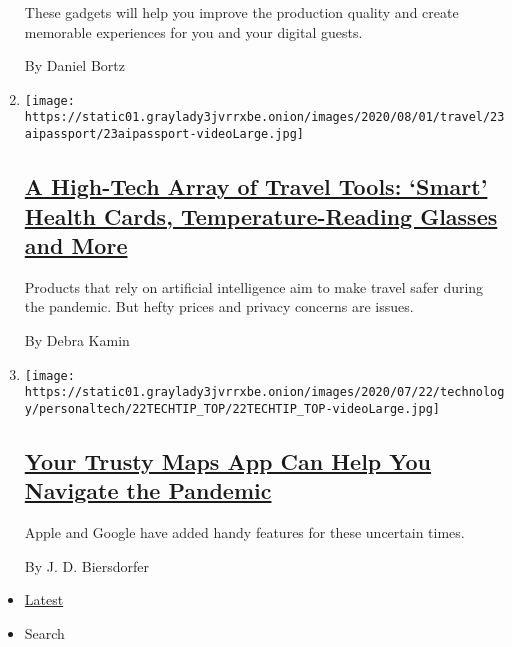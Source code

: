 \begin{enumerate}
  These gadgets will help you improve the production quality and create
  memorable experiences for you and your digital guests.

  By Daniel Bortz
\item
  \texttt{[image: https://static01.graylady3jvrrxbe.onion/images/2020/08/01/travel/23aipassport/23aipassport-videoLarge.jpg]}

  \hypertarget{a-high-tech-array-of-travel-tools-smart-health-cards-temperature-reading-glasses-and-more}{%
  \subsection{\texorpdfstring{\href{/2020/07/23/travel/artificial-intelligence-coronavirus-passport.html}{A
  High-Tech Array of Travel Tools: `Smart' Health Cards,
  Temperature-Reading Glasses and
  More}}{A High-Tech Array of Travel Tools: `Smart' Health Cards, Temperature-Reading Glasses and More}}\label{a-high-tech-array-of-travel-tools-smart-health-cards-temperature-reading-glasses-and-more}}

  Products that rely on artificial intelligence aim to make travel safer
  during the pandemic. But hefty prices and privacy concerns are issues.

  By Debra Kamin
\item
  \texttt{[image: https://static01.graylady3jvrrxbe.onion/images/2020/07/22/technology/personaltech/22TECHTIP\_TOP/22TECHTIP\_TOP-videoLarge.jpg]}

  \hypertarget{your-trusty-maps-app-can-help-you-navigate-the-pandemic}{%
  \subsection{\texorpdfstring{\href{/2020/07/22/technology/personaltech/maps-apps-coronavirus-pandemic.html}{Your
  Trusty Maps App Can Help You Navigate the
  Pandemic}}{Your Trusty Maps App Can Help You Navigate the Pandemic}}\label{your-trusty-maps-app-can-help-you-navigate-the-pandemic}}

  Apple and Google have added handy features for these uncertain times.

  By J. D. Biersdorfer
\end{enumerate}

\begin{itemize}
\tightlist
\item
  \protect\hyperlink{stream-panel}{Latest}
\item
  Search
\end{itemize}

